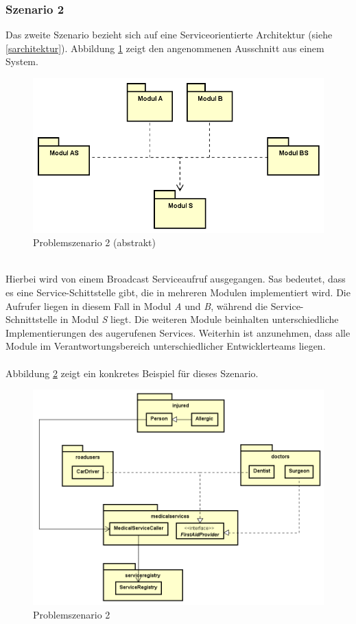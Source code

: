 \documentclass[11pt, 
ngerman,
doublespacing,
chapterinoneline, %
consistentlayout, %
]{scrartcl}
\begin{document}
\subsubsection{Szenario 2}\label{prob2}
Das zweite Szenario bezieht sich auf eine Serviceorientierte Architektur (siehe \ref{sarchitektur}).
Abbildung \ref{fig:problem2} zeigt den angenommenen Ausschnitt aus einem System. 
\begin{figure}[h]
  \centering
  \includegraphics[scale=0.7]{pics/problemS2Abstrakt.png}
  \caption{Problemszenario 2 (abstrakt)}
  \label{fig:problem2}
\end{figure}\\
Hierbei wird von einem Broadcast Serviceaufruf ausgegangen. Sas bedeutet, dass es eine Service-Schittstelle gibt, die in mehreren Modulen implementiert wird. Die Aufrufer liegen in diesem Fall in Modul \emph{A} und \emph{B}, während die Service-Schnittstelle in Modul \emph{S} liegt. Die weiteren Module beinhalten unterschiedliche Implementierungen des augerufenen Services. Weiterhin ist anzunehmen, dass alle Module im Verantwortungsbereich unterschiedlicher Entwicklerteams liegen.\\\\
Abbildung \ref{fig:problem2Konkret} zeigt ein konkretes Beispiel für dieses Szenario.
\begin{figure}[h]
  \centering
  \includegraphics[scale=0.5]{pics/problemS2Konkret.png}
  \caption{Problemszenario 2}
  \label{fig:problem2Konkret}
\end{figure}\\
\end{document}
